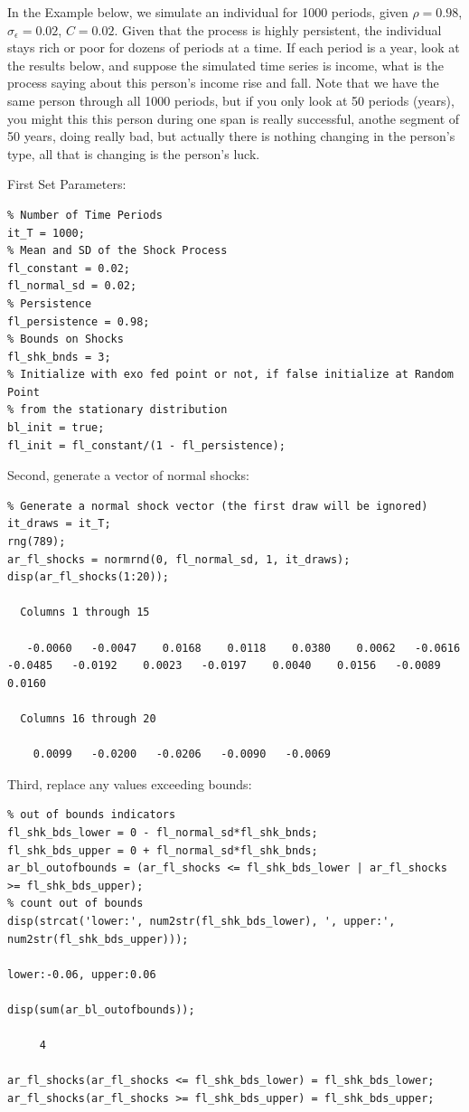 \documentclass[
]{book}
\begin{document}
In the Example below, we simulate an individual for 1000 periods, given
\(\rho =0.98\), \(\sigma_{\epsilon } =0.02\), \(C=0.02\). Given that the
process is highly persistent, the individual stays rich or poor for
dozens of periods at a time. If each period is a year, look at the
results below, and suppose the simulated time series is income, what is
the process saying about this person's income rise and fall. Note that
we have the same person through all 1000 periods, but if you only look
at 50 periods (years), you might this this person during one span is
really successful, anothe segment of 50 years, doing really bad, but
actually there is nothing changing in the person's type, all that is
changing is the person's luck.

First Set Parameters:

\begin{verbatim}
% Number of Time Periods
it_T = 1000;
% Mean and SD of the Shock Process
fl_constant = 0.02;
fl_normal_sd = 0.02;
% Persistence
fl_persistence = 0.98;
% Bounds on Shocks
fl_shk_bnds = 3;
% Initialize with exo fed point or not, if false initialize at Random Point
% from the stationary distribution
bl_init = true;
fl_init = fl_constant/(1 - fl_persistence);
\end{verbatim}

Second, generate a vector of normal shocks:

\begin{verbatim}
% Generate a normal shock vector (the first draw will be ignored)
it_draws = it_T;
rng(789);
ar_fl_shocks = normrnd(0, fl_normal_sd, 1, it_draws);
disp(ar_fl_shocks(1:20));

  Columns 1 through 15

   -0.0060   -0.0047    0.0168    0.0118    0.0380    0.0062   -0.0616   -0.0485   -0.0192    0.0023   -0.0197    0.0040    0.0156   -0.0089    0.0160

  Columns 16 through 20

    0.0099   -0.0200   -0.0206   -0.0090   -0.0069
\end{verbatim}

Third, replace any values exceeding bounds:

\begin{verbatim}
% out of bounds indicators
fl_shk_bds_lower = 0 - fl_normal_sd*fl_shk_bnds;
fl_shk_bds_upper = 0 + fl_normal_sd*fl_shk_bnds;
ar_bl_outofbounds = (ar_fl_shocks <= fl_shk_bds_lower | ar_fl_shocks >= fl_shk_bds_upper);
% count out of bounds
disp(strcat('lower:', num2str(fl_shk_bds_lower), ', upper:', num2str(fl_shk_bds_upper)));

lower:-0.06, upper:0.06

disp(sum(ar_bl_outofbounds));

     4

ar_fl_shocks(ar_fl_shocks <= fl_shk_bds_lower) = fl_shk_bds_lower;
ar_fl_shocks(ar_fl_shocks >= fl_shk_bds_upper) = fl_shk_bds_upper;
\end{verbatim}
\end{document}
